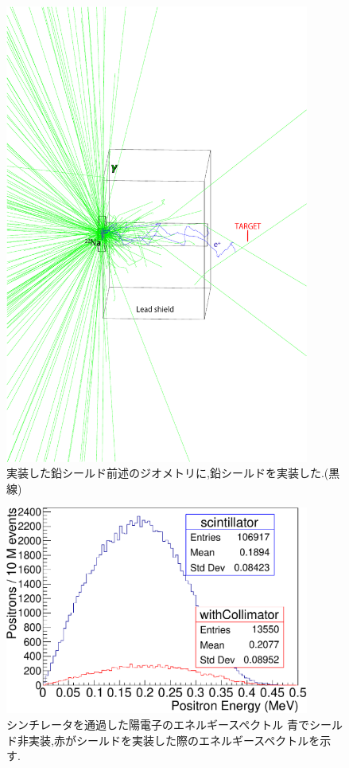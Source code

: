 \begin{figure}[!tbp]
	\centering
		\includegraphics[width=10cm]{img/test1b_geometry.pdf}
	\caption[実装した鉛シールド]{実装した鉛シールド\newline 前述のジオメトリに,鉛シールドを実装した.(黒線)}
	\label{test1b_geometry}
\end{figure}

\begin{figure}[!tbp]
	\centering
		\includegraphics[width=10cm]{fig/collimator_loss.pdf}
	\caption[シンチレータを通過した陽電子のエネルギースペクトル] {シンチレータを通過した陽電子のエネルギースペクトル \newline 青でシールド非実装,赤がシールドを実装した際のエネルギースペクトルを示す.}
	\label{collimator_loss}
\end{figure}

